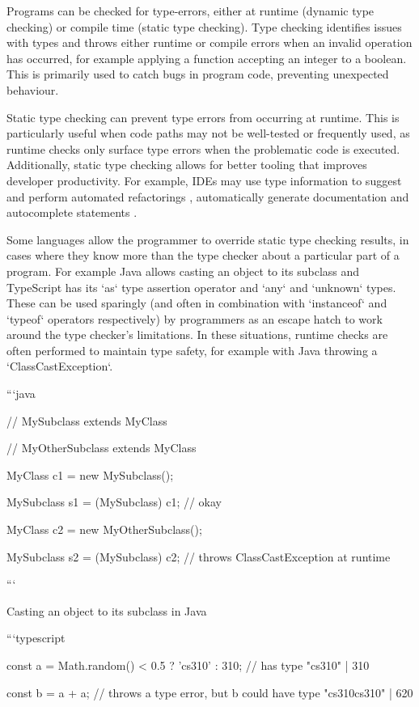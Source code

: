 \documentclass[a4paper,fleqn,12pt]{article}
\begin{document}
Programs can be checked for type-errors, either at runtime (dynamic type checking) or compile time (static type checking). Type checking identifies issues with types and throws either runtime or compile errors when an invalid operation has occurred, for example applying a function accepting an integer to a boolean. This is primarily used to catch bugs in program code, preventing unexpected behaviour.

Static type checking can prevent type errors from occurring at runtime. This is particularly useful when code paths may not be well-tested or frequently used, as runtime checks only surface type errors when the problematic code is executed. Additionally, static type checking allows for better tooling that improves developer productivity. For example, IDEs may use type information to suggest and perform automated refactorings \citep{ref1}, automatically generate documentation \citep{ref2} and autocomplete statements \citep{ref3}.

Some languages allow the programmer to override static type checking results, in cases where they know more than the type checker about a particular part of a program. For example Java allows casting an object to its subclass and TypeScript has its `as` type assertion operator and `any` and `unknown` types. These can be used sparingly (and often in combination with `instanceof` and `typeof` operators respectively) by programmers as an escape hatch to work around the type checker’s limitations. In these situations, runtime checks are often performed to maintain type safety, for example with Java throwing a `ClassCastException`.

```java

// MySubclass extends MyClass

// MyOtherSubclass extends MyClass

MyClass c1 = new MySubclass();

MySubclass s1 = (MySubclass) c1; // okay

MyClass c2 = new MyOtherSubclass();

MySubclass s2 = (MySubclass) c2; // throws ClassCastException at runtime

```

Casting an object to its subclass in Java

```typescript

const a = Math.random() < 0.5 ? 'cs310' : 310; // has type "cs310" | 310

const b = a + a; // throws a type error, but b could have type "cs310cs310" | 620
\end{document}
